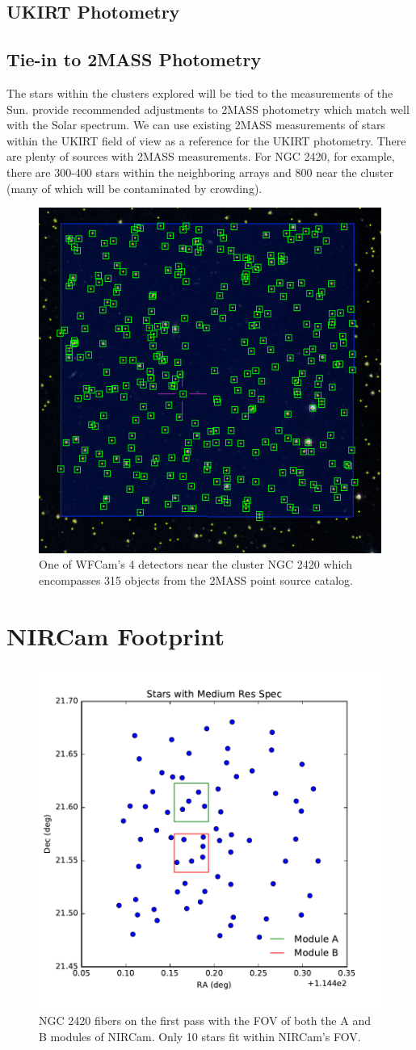 \documentclass{aastex6}
\begin{document}
\subsection{UKIRT Photometry}

\subsection{Tie-in to 2MASS Photometry}

The stars within the clusters explored will be tied to the measurements of the Sun.
\citet{rieke2008absIRcal} provide recommended adjustments to 2MASS photometry which match well with the Solar spectrum.
We can use existing 2MASS measurements of stars within the UKIRT field of view as a reference for the UKIRT photometry.
There are plenty of sources with 2MASS measurements.
For NGC 2420, for example, there are 300-400 stars within the neighboring arrays and 800 near the cluster (many of which will be contaminated by crowding).

\begin{figure}[!hbtp]
\centering
\includegraphics[width=.4\columnwidth]{aladin_ngc2420_wfcam_square.png}
\caption{One of WFCam's 4 detectors near the cluster NGC 2420 which encompasses 315 objects from the 2MASS point source catalog.}\label{fig:wfcam3}
\end{figure}

\section{NIRCam Footprint}
\begin{figure}[!hbtp]
\centering
\includegraphics[width=.4\columnwidth]{nircam_fov_fibers.pdf}
\caption{NGC 2420 fibers on the first pass with the FOV of both the A and B modules of NIRCam.
Only 10 stars fit within NIRCam's FOV.}\label{fig:NCFOV}
\end{figure}
\end{document}
